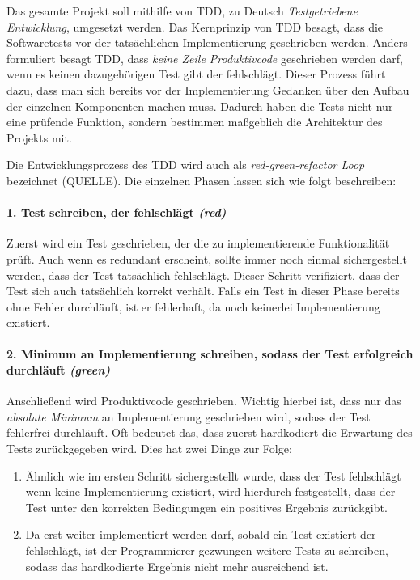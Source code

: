 Das gesamte Projekt soll mithilfe von \ac{TDD}, zu Deutsch \textit{Testgetriebene Entwicklung}, umgesetzt werden. Das Kernprinzip von \acs{TDD} besagt, dass die Softwaretests vor der tatsächlichen Implementierung geschrieben werden. Anders formuliert besagt \acs{TDD}, dass \emph{keine Zeile Produktivcode} geschrieben werden darf, wenn es keinen dazugehörigen Test gibt der fehlschlägt. Dieser Prozess führt dazu, dass man sich bereits  vor der Implementierung Gedanken über den Aufbau der einzelnen Komponenten machen muss. Dadurch haben die Tests nicht nur eine prüfende Funktion, sondern bestimmen maßgeblich die Architektur des Projekts mit. 

Die Entwicklungsprozess des \ac{TDD} wird auch als \textit{red-green-refactor Loop} bezeichnet (QUELLE). Die einzelnen Phasen lassen sich wie folgt beschreiben:


\paragraph{1. Test schreiben, der fehlschlägt \textit{(red)}}
Zuerst wird ein Test geschrieben, der die zu implementierende Funktionalität prüft. Auch wenn es redundant erscheint, sollte immer noch einmal sichergestellt werden, dass der Test tatsächlich fehlschlägt. Dieser Schritt verifiziert, dass der Test sich auch tatsächlich korrekt verhält. Falls ein Test in dieser Phase bereits ohne Fehler durchläuft, ist er fehlerhaft, da noch keinerlei Implementierung existiert.

\paragraph{2. Minimum an Implementierung schreiben, sodass der Test erfolgreich durchläuft \textit{(green)}}
Anschließend wird Produktivcode geschrieben. Wichtig hierbei ist, dass nur das \emph{absolute Minimum} an Implementierung geschrieben wird, sodass der Test fehlerfrei durchläuft. Oft bedeutet das, dass zuerst hardkodiert die Erwartung des Tests zurückgegeben wird. Dies hat zwei Dinge zur Folge:
\begin{enumerate}
	\item Ähnlich wie im ersten Schritt sichergestellt wurde, dass der Test fehlschlägt wenn keine Implementierung existiert, wird hierdurch festgestellt, dass der Test unter den korrekten Bedingungen ein positives Ergebnis zurückgibt.
	\item Da erst weiter implementiert werden darf, sobald ein Test existiert der fehlschlägt, ist der Programmierer gezwungen weitere Tests zu schreiben, sodass das hardkodierte Ergebnis nicht mehr ausreichend ist.
\end{enumerate}

